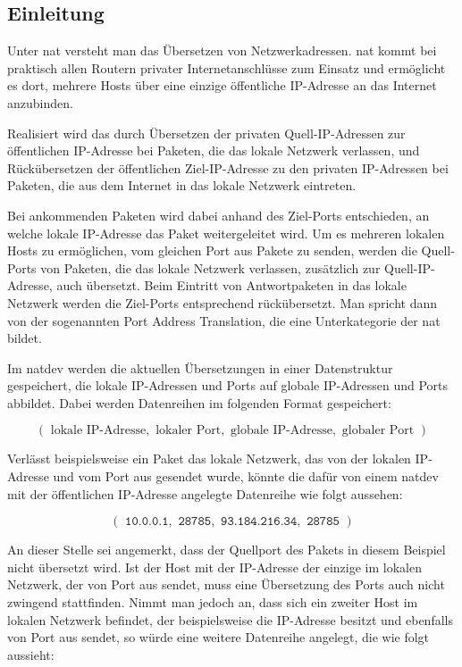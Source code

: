 
\label{dcl-natt}

\subsection{Einleitung}
Unter \gls{nat} versteht man das Übersetzen von Netzwerkadressen.
\Gls{nat} kommt bei praktisch allen Routern privater Internetanschlüsse zum
Einsatz und ermöglicht es dort, mehrere Hosts über eine einzige öffentliche
IP-Adresse an das Internet anzubinden.

Realisiert wird das durch Übersetzen der privaten Quell-IP-Adressen zur
öffentlichen IP-Adresse bei Paketen, die das lokale Netzwerk verlassen, und
Rückübersetzen der öffentlichen Ziel-IP-Adresse zu den privaten IP-Adressen
bei Paketen, die aus dem Internet in das lokale Netzwerk eintreten.

Bei ankommenden Paketen wird dabei anhand des Ziel-Ports entschieden, an welche
lokale IP-Adresse das Paket weitergeleitet wird.
Um es mehreren lokalen Hosts zu ermöglichen, vom gleichen Port aus Pakete zu
senden, werden die Quell-Ports von Paketen, die das lokale Netzwerk verlassen,
zusätzlich zur Quell-IP-Adresse, auch übersetzt.
Beim Eintritt von Antwortpaketen in das lokale Netzwerk werden die Ziel-Ports
entsprechend rückübersetzt. Man spricht dann von der sogenannten Port Address
Translation, die eine Unterkategorie der \acrlong{nat} bildet.

Im \gls{natdev} werden die aktuellen Übersetzungen in einer Datenstruktur
gespeichert, die lokale IP-Adressen und Ports auf globale IP-Adressen und Ports
abbildet.
Dabei werden Datenreihen im folgenden Format gespeichert:

\begin{equation*}
    (\text{ lokale IP-Adresse}, \text{ lokaler Port}, \text{ globale IP-Adresse}, \text{ globaler Port })
\end{equation*}

Verlässt beispielsweise ein Paket das lokale Netzwerk, das von der lokalen
IP-Adresse  und vom Port  aus gesendet wurde,
könnte die dafür von einem \gls{natdev} mit der öffentlichen IP-Adresse
 angelegte Datenreihe wie folgt aussehen:

\begin{equation*}
    (\texttt{ 10.0.0.1}, \texttt{ 28785}, \texttt{ 93.184.216.34}, \texttt{ 28785 })
\end{equation*}

An dieser Stelle sei angemerkt, dass der Quellport des Pakets in diesem Beispiel
nicht übersetzt wird.
Ist der Host mit der IP-Adresse  der einzige im lokalen Netzwerk,
der von Port  aus sendet, muss eine Übersetzung des Ports auch nicht
zwingend stattfinden.
Nimmt man jedoch an, dass sich ein zweiter Host im lokalen Netzwerk befindet,
der beispielsweise die IP-Adresse  besitzt und ebenfalls von Port
 aus sendet, so würde eine weitere Datenreihe angelegt, die wie
folgt aussieht:

